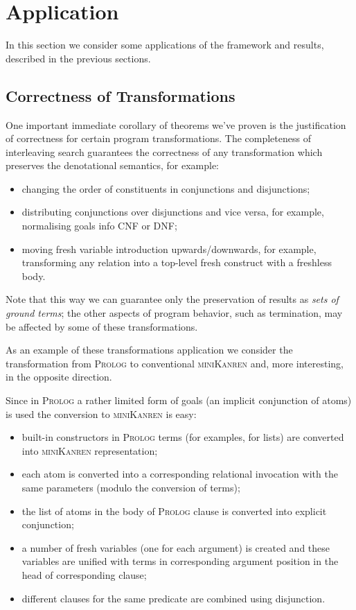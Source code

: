 \section{Application}

In this section we consider some applications of the framework and results, described in the previous sections.

\subsection{Correctness of Transformations}

One important immediate corollary of theorems we've proven is the justification of correctness for certain program transformations.
The completeness of interleaving search guarantees the correctness of any transformation which preserves the denotational semantics,
for example:

\begin{itemize}
\item changing the order of constituents in conjunctions and disjunctions;
\item distributing conjunctions over disjunctions and vice versa, for example, normalising goals info CNF or DNF;
\item moving fresh variable introduction upwards/downwards, for example, transforming any relation into a top-level fresh
  construct with a freshless body.
\end{itemize}

Note that this way we can guarantee only the preservation of results as \emph{sets of ground terms}; the other aspects of program behavior,
such as termination, may be affected by some of these transformations. 

As an example of these transformations application we consider the transformation from \textsc{Prolog} to conventional \textsc{miniKanren} and,
more interesting, in the opposite direction.

Since in \textsc{Prolog} a rather limited form of goals (an implicit conjunction of atoms) is used the conversion to \textsc{miniKanren} is easy:

\begin{itemize}
  \item built-in constructors in \textsc{Prolog} terms (for examples, for lists) are converted into \textsc{miniKanren} representation;
  \item each atom is converted into a corresponding relational invocation with the same parameters (modulo the conversion of terms);
  \item the list of atoms in the body of \textsc{Prolog} clause is converted into explicit conjunction;
  \item a number of fresh variables (one for each argument) is created and these variables are unified with terms in corresponding
    argument position in the head of corresponding clause;
  \item different clauses for the same predicate are combined using disjunction.
\end{itemize}

